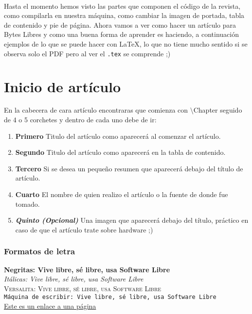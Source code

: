 \paragraph{} Hasta el momento hemos visto las partes que componen el código de la revista, como compilarla en nuestra máquina, como cambiar la imagen de portada, tabla de contenido y pie de página. Ahora vamos a ver como hacer un artículo para Bytes Libres y como una buena forma de aprender es haciendo, a continuación ejemplos de lo que se puede hacer con \LaTeX{}, lo que no tiene mucho sentido si se observa solo el PDF pero al ver el \texttt{.tex} se comprende ;)

\section*{Inicio de artículo}
En la cabecera de cara artículo encontraras que comienza con $\setminus$Chapter seguido
de 4 o 5 corchetes y dentro de cada uno debe de ir:
\begin{enumerate}
	\item \textbf{Primero} Titulo del artículo como aparecerá al comenzar el artículo.
	\item \textbf{Segundo} Titulo del artículo como aparecerá en la tabla de contenido.
	\item \textbf{Tercero} Si se desea un pequeño resumen que aparecerá debajo del título de
	artículo.
	\item \textbf{Cuarto} El nombre de quien realizo el artículo o la fuente de donde 
	fue tomado.
	\item \textbf{\textit{Quinto (Opcional)}} Una imagen que aparecerá debajo del título,
	práctico en caso de que el artículo trate sobre hardware ;)
\end{enumerate}


\subsubsection*{Formatos de letra}
\textbf{Negritas: Vive libre, sé libre, usa Software Libre} \\
\textit{Itálicas: Vive libre, sé libre, usa Software Libre} \\
\textsc{Versalita: Vive libre, sé libre, usa Software Libre} \\
\texttt{Máquina de escribir: Vive libre, sé libre, usa Software Libre} \\
\href{http://gulag.org.mx/}{Este es un enlace a una página} \\

